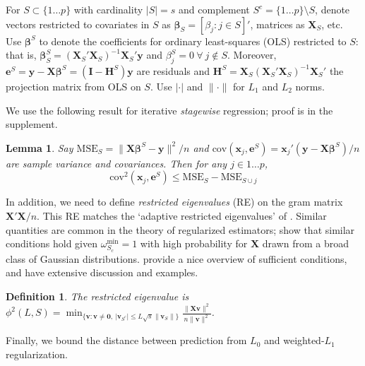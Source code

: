 \documentclass[12pt]{article}
\newtheorem{definition}{\sc Definition}[section]
\newtheorem{lemma}{\sc Lemma}[section]
\newcommand{\bs}[1]{\boldsymbol{#1}}
\newcommand{\mr}[1]{\mathrm{#1}}
\newcommand{\bm}[1]{\mathbf{#1}}
\begin{document}
 For  $S \subset \{1\ldots p\}$ with cardinality $|S|=s$ and complement $S^c =
\{1\ldots p\}\setminus S$, denote vectors restricted to covariates in $S$ as
$\bm{\beta}_S = [\beta_j:j\in S]'$, matrices as $\bm{X}_S$, etc.  Use
$\bs{\beta}^S$ to denote the coefficients for ordinary least-squares (OLS)
restricted to $S$: that is, $\bs{\beta}^S_S =
(\bm{X}_S'\bm{X}_S)^{-1}\bm{X}_S'\bm{y}$ and $\beta^{S}_j = 0~\forall~j\notin
S$.  Moreover, $\bm{e}^S = \bm{y}-\bm{X}\bs{\beta}^S =
(\bm{I}-\bm{H}^S)\bm{y}$ are residuals and $\bm{H}^S =
\bm{X}_S(\bm{X}_S'\bm{X}_S)^{-1}\bm{X}_S'$ the projection matrix from OLS on $S$.  
Use $|\cdot|$ and $\|\cdot\|$ for $L_1$ and $L_2$ norms.

We use the following result for iterative \textit{stagewise} regression; proof is in the supplement. 
\begin{lemma}\label{SSElemma}
Say $\mr{MSE}_S = \|\bm{X}\bs{\beta}^S-\bm{y}\|^2/n$ and 
$\mr{cov}(\bs{x}_j,\bm{e}^S) = \bs{x}_j'(\bm{y}-\bm{X}\bs{\beta}^S)/n$ are sample variance and covariances.  Then for any $j \in 1\ldots p$, 
\[
\mr{cov}^2(\bs{x}_j,\bm{e}^S) \leq \mr{MSE}_S - \mr{MSE}_{S\cup j}
\]
\end{lemma}

In addition, we need to define {\it restricted eigenvalues} (RE) on the gram matrix $\bm{X}'\bm{X}/n$.
  This  RE  matches the `adaptive restricted eigenvalues' of \cite{buhlmann_statistics_2011}.  
Similar quantities are common in the theory of regularized estimators; \cite{raskutti_restricted_2010} show that similar conditions hold given  $\omega^{\mr{min}}_{S_c}=1$ with high probability for $\bm{X}$ drawn from a broad class of Gaussian distributions.  \cite{bickel_simultaneous_2009} provide a nice overview of sufficient conditions, and \cite{buhlmann_statistics_2011} have extensive discussion and examples.  
\begin{definition}\label{redef}
The restricted eigenvalue is
$
\phi^2(L,S) = \min_{\{\bm{v}: \bm{v}\neq \bm{0},~|\bm{v}_{S^c}| \leq L\sqrt{s}\|\bm{v}_S\|\}}\frac{\|\bm{X}\bm{v}\|^2}{n\|\bm{v}\|^2}$.
\end{definition}

\noindent Finally,  we bound the distance between prediction
from $L_0$ and weighted-$L_1$ regularization.  
\end{document}
